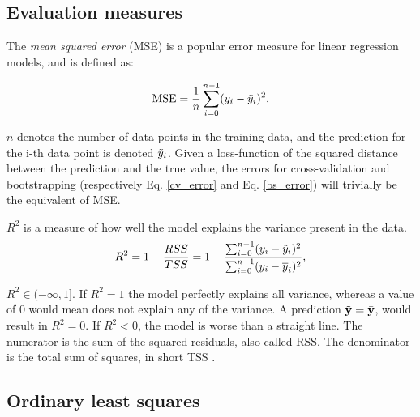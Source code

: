 

\subsection{Evaluation measures}

The \emph{mean squared error} (MSE) is a popular error measure for linear regression models, and is defined as: 

\begin{equation}\label{mse}
    \text{MSE} = \frac{1}{n}\sum_{i=0}^{n-1}(y_i-\Tilde{y}_i)^2.
\end{equation}

$n$ denotes the number of data points in the training data, and the prediction for the i-th data point is denoted $\Tilde{y}_i$. Given a loss-function of the squared distance between the prediction and the true value, the errors for cross-validation and bootstrapping (respectively Eq. \ref{cv_error} and Eq. \ref{bs_error}) will trivially be the equivalent of MSE. 

$R^2$ is a measure of how well the model explains the variance present in the data. 
\begin{equation}
    R^2 = 1 - \frac{RSS}{TSS}= 1 - \frac{\sum_{i=0}^{n-1}(y_i-\Tilde{y}_i)^2}{\sum_{i=0}^{n-1}(y_i-\overline{y}_i)^2},
\end{equation}

$R^2 \in (-\infty,1]$. If $R^2 = 1$ the model perfectly explains all variance, whereas a value of 0 would mean does not explain any of the variance. 
A prediction $\tilde {\mathbf{y}} = \bar {\mathbf{y}}$, would result in $R^2 = 0$.
If $R^2<0$, the model is worse than a straight line.
The numerator is the sum of the squared residuals, also called RSS. The denominator is the total sum of squares, in short TSS \cite[p. 29]{martin}.

\subsection{Ordinary least squares}

